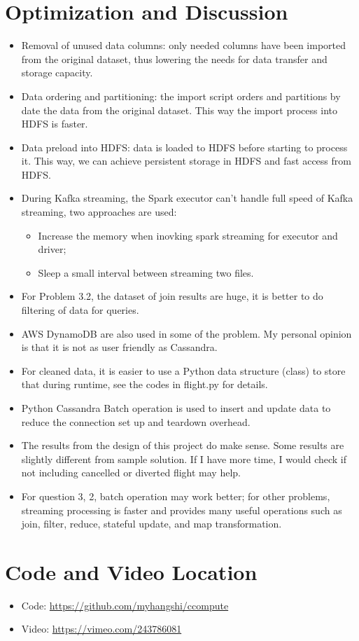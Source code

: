 \documentclass[fontsize=11pt,paper=a4]{scrartcl}
\begin{document}
\section{Optimization and Discussion}
\begin{itemize}
\item Removal of unused data columns: only needed columns have been imported from the original dataset, thus lowering the needs for data transfer and storage capacity.
\item Data ordering and partitioning: the import script orders and partitions by date the data from the original dataset. This way the import process into HDFS is faster.
\item Data preload into HDFS: data  is loaded to HDFS before starting to process it. This way, we can achieve persistent storage in HDFS and fast access from HDFS.
\item During Kafka streaming, the Spark executor can't handle full speed of Kafka streaming, two approaches are used: 
\begin{itemize}
\item Increase the memory when inovking spark streaming for executor and driver; 
\item Sleep a small interval between streaming two files. 
\end{itemize} 
\item For Problem 3.2, the dataset of join results are huge, it is better to do filtering of data for queries. 
\item AWS DynamoDB are also used in some of the problem. My personal opinion is that it is not as user friendly as Cassandra. 
\item For cleaned data, it is easier to use a Python data structure (class) to store that during runtime, see the codes in flight.py for details. 
\item Python Cassandra Batch operation is used to insert and update data to reduce the connection set up and teardown overhead. 
\item The results from the design of this project do make sense. Some results are slightly different from sample solution. If I have more time, I would check if not including cancelled or diverted flight may help. 
\item For question 3, 2, batch operation may work better; for other problems, streaming processing is faster and provides many useful operations such as join, filter, reduce, stateful update, and map transformation. 
\end{itemize} 
 
\section{Code and Video Location}
\begin{itemize}
\item Code:    \url{https://github.com/myhangshi/ccompute}
\item Video:   \url{https://vimeo.com/243786081}
\end{itemize} 
\end{document}
